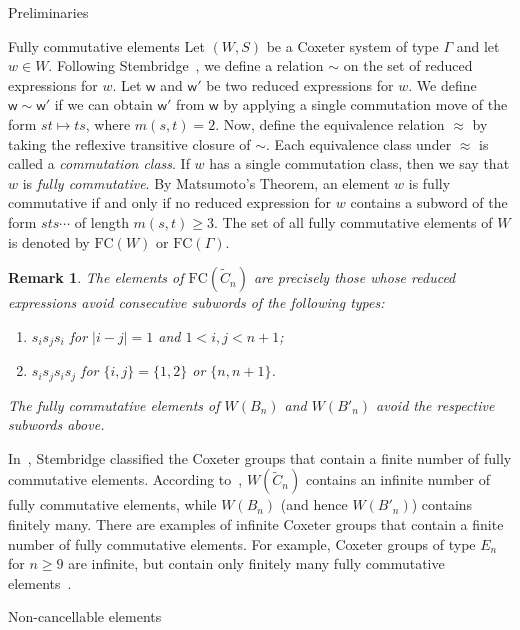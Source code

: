 \documentclass[12pt]{amsart}
\newtheorem{rem}[thm]{Remark}
\newcommand{\C}{\widetilde{C}}
\renewcommand{\(}{\left(}
\renewcommand{\)}{\right)}
\newcommand{\w}{\mathsf{w}}
\newcommand{\FC}{\mathrm{FC}}
\begin{document}
\begin{section}{Preliminaries}
\begin{subsection}{Fully commutative elements}
Let $(W,S)$ be a Coxeter system of type $\Gamma$ and let $w \in W$. Following Stembridge~\cite{Stembridge.J:B}, we define a relation $\sim$ on the set of reduced expressions for $w$.  Let $\w$ and $\w'$ be two reduced expressions for $w$.  We define $\w \sim \w'$ if we can obtain $\w'$ from $\w$ by applying a single commutation move of the form $st \mapsto ts$, where $m(s,t)=2$.  Now, define the equivalence relation $\approx$ by taking the reflexive transitive closure of $\sim$.  Each equivalence class under $\approx$ is called a \emph{commutation class}. If $w$ has a single commutation class, then we say that $w$ is \emph{fully commutative}.  By Matsumoto's Theorem, an element $w$ is fully commutative if and only if no reduced expression for $w$ contains a subword of the form $sts \cdots$ of length $m(s,t) \geq 3$.  The set of all fully commutative elements of $W$ is denoted by $\FC(W)$ or $\FC(\Gamma)$.

\begin{rem}\label{rem:illegal_convex_chains}
The elements of $\FC(\C_{n})$ are precisely those whose reduced expressions avoid consecutive subwords of the following types:
\begin{enumerate}
\item $s_{i}s_{j}s_{i}$ for $|i-j|=1$ and $1< i,j < n+1$;
\item $s_{i}s_{j}s_{i}s_{j}$ for $\{i,j\}=\{1,2\}$ or $\{n,n+1\}$.
\end{enumerate}
The fully commutative elements of $W(B_{n})$ and $W(B'_{n})$ avoid the respective subwords above.
\end{rem}

In~\cite{Stembridge.J:B}, Stembridge classified the Coxeter groups that contain a finite number of fully commutative elements.  According to~\cite[Theorem 5.1]{Stembridge.J:B}, $W(\C_{n})$ contains an infinite number of fully commutative elements, while $W(B_{n})$ (and hence $W(B'_n)$) contains finitely many.  There are examples of infinite Coxeter groups that contain a finite number of fully commutative elements.  For example, Coxeter groups of type $E_n$ for $n\geq 9$ are infinite, but contain only finitely many fully commutative elements~\cite[Theorem 5.1]{Stembridge.J:B}.

\end{subsection}


\begin{subsection}{Non-cancellable elements}\label{subsec:non-cancellable}


\end{subsection}
\end{section}
\end{document}
